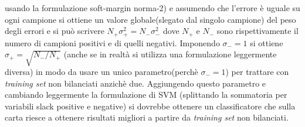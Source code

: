  usando la formulazione soft-margin norma-2) e assumendo che l'errore è uguale su ogni campione si ottiene un valore globale(slegato dal singolo campione) del peso degli errori e si può scrivere $N_{+}\sigma_{+}^{2} =N_{-}\sigma_{-}^{2} $ dove $N_{+} \text{ e } N_{-}$ sono rispettivamente il numero di campioni positivi e di quelli negativi. Imponendo $\sigma_{-}=1$ si ottiene $\sigma_{+}=\sqrt{N_{-}/N_{+}}$ (anche se in realtà si utilizza una formulazione leggermente diversa) in modo da usare un unico parametro(perchè $\sigma_{-}=1$) per trattare con \textit{training set} non bilanciati  anzichè due. Aggiungendo questo parametro e cambiando leggermente la formulazione di \ac{SVM} (splittando la sommatoria per variabili slack positive e negative) si dovrebbe ottenere un classificatore che sulla carta riesce a ottenere risultati migliori a partire da \textit{training set} non bilanciati.
 
